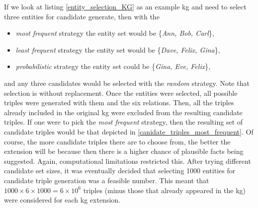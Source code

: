 If we look at listing \ref{entity_selection_KG} as an example \gls{kg} and need to select three entities for candidate generate, then with the 
\begin{itemize}
    \item \textit{most frequent} strategy the entity set would be \{\textit{Ann, Bob, Carl}\},
    \item \textit{least frequent} strategy the entity set would be \{\textit{Dave, Felix, Gina}\},
    \item \textit{probabilistic} strategy the entity set could be \{\textit{Gina, Eve, Felix}\},
\end{itemize}
and any three candidates would be selected with the \textit{random} strategy. Note that selection is without replacement. Once the entities were selected, all possible triples were generated with them and the six relations. Then, all the triples already included in the original \gls{kg} were excluded from the resulting candidate triples. If one were to pick the \textit{most frequent} strategy, then the resulting set of candidate triples would be that depicted in \cref{canidate_triples_most_frequent}. Of course, the more candidate triples there are to choose from, the better the extension will be because then there is a higher chance of plausible facts being suggested. Again, computational limitations restricted this. After trying different candidate set sizes, it was eventually decided that selecting 1000 entities for candidate triple generation was a feasible number. This meant that $ 1000 \times 6 \times 1000 = 6 \times 10^6 $ triples (minus those that already appeared in the \gls{kg}) were considered for each \gls{kg} extension.


